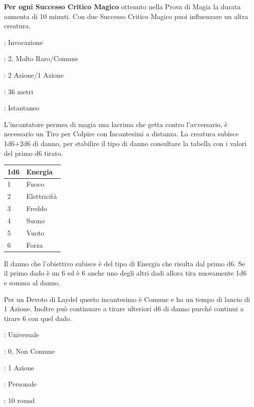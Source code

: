 \begin{multicols}{2}
\textbf{Per ogni Successo Critico Magico} ottenuto nella Prova di Magia la durata aumenta di 10 minuti. Con due Successo Critico Magico puoi influenzare un altra creatura.

\noindent\colorbox{OBSSgold!10}{
\begin{minipage}{0.95\linewidth}
\begin{description}[noitemsep, topsep=0pt, parsep=0pt, partopsep=0pt, leftmargin=0cm, labelwidth=1.3cm]
	\item[\textbf{Lista}]: Invocazione
	\item[\textbf{Livello}]: 2, Molto Raro/Comune
	\item[\textbf{Lancio}]: 2 Azione/1 Azione
	\item[\textbf{Gittata}]: 36 metri
	\item[\textbf{Durata}]: Istantaneo
\end{description}
\end{minipage}}\smallskip

L'incantatore permea di magia una lacrima che getta contro l'avversario, è necessario un Tiro per Colpire con Incantesimi a distanza.
La creatura subisce 1d6+2d6 di danno, per stabilire il tipo di danno consultare la tabella con i valori del primo d6 tirato.

\medskip

\noindent\begin{tabular}{l|l}
	\toprule
 \rowcolor{gray!20}\textbf{1d6}&\textbf{Energia}\\
	\toprule
	1 &Fuoco\\
 \rowcolor{gray!20}2 &Elettricità\\
	3 &Freddo\\
 \rowcolor{gray!20}4 &Suono\\
	5 &Vuoto\\
 \rowcolor{gray!20}6 &Forza
\end{tabular}

\medskip

Il danno che l'obiettivo subisce è del tipo di Energia che risulta dal primo d6. Se il primo dado è un 6 ed è 6 anche uno degli altri dadi allora tira nuovamente 1d6 e somma al danno.

Per un Devoto di Laydel questo incantesimo è Comune e ha un tempo di lancio di 1 Azione. Inoltre può continuare a tirare ulteriori d6 di danno purché continui a tirare 6 con quel dado.

\noindent\colorbox{OBSSgold!10}{
\begin{minipage}{0.95\linewidth}
\begin{description}[noitemsep, topsep=0pt, parsep=0pt, partopsep=0pt, leftmargin=0cm, labelwidth=1.3cm]
	\item[\textbf{Lista}]: Universale
	\item[\textbf{Livello}]: 0, Non Comune
	\item[\textbf{Lancio}]: 1 Azione
	\item[\textbf{Gittata}]: Personale
	\item[\textbf{Durata}]: 10 round
\end{description}
\end{minipage}}\smallskip


\end{multicols}
